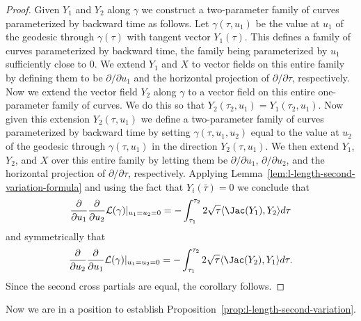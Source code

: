 \begin{proof}
\sketch
{}
Given $Y_1$ and $Y_2$ along $\gamma$ we construct a two-parameter
family of curves parameterized by backward time as follows. Let
$\gamma(\tau,u_1)$ be the value at $u_1$ of the geodesic through
$\gamma(\tau)$ with tangent vector $Y_1(\tau)$. This defines a
family of curves parameterized by backward time, the family being
parameterized by  $u_1$ sufficiently close to $0$. We extend
 $Y_1$ and $X$ to vector fields on this entire family by defining them to be
 $\partial/\partial u_1$ and the
horizontal projection of $\partial/\partial \tau$, respectively.
 Now we
extend the vector field $Y_2$ along $\gamma$ to a vector field on
this entire one-parameter family of curves. We do this so that
$Y_2(\tau_2,u_1)=Y_1(\tau_2,u_1)$. Now given this extension
$Y_2(\tau,u_1)$ we define a two-parameter family of curves
parameterized by backward time
 by setting $\gamma(\tau,u_1,u_2)$ equal to the value at $u_2$ of the geodesic
 through $\gamma(\tau,u_1)$ in the direction $Y_2(\tau,u_1)$.
 We then extend  $Y_1$, $Y_2$, and $X$ over this entire family by letting them be
 $\partial/\partial u_1$,
$\partial/\partial u_2$, and the horizontal projection of $\partial/ \partial
\tau$, respectively. Applying Lemma~\ref{lem:l-length-second-variation-formula} and using the fact that
$Y_i(\bar\tau)=0$ we conclude that
$$\frac{\partial}{\partial u_1}\frac{\partial}{\partial u_2}{\mathcal L}(\gamma)|_{u_1=u_2=0}= -\int_{\tau_1}^{\tau_2}2\sqrt{\tau}\langle
\Jac(Y_1),Y_2\rangle d\tau$$ and symmetrically that
$$\frac{\partial}{\partial u_2}\frac{\partial}{\partial u_1}{\mathcal L}(\gamma)|_{u_1=u_2=0}= -\int_{\tau_1}^{\tau_2}2\sqrt{\tau}\langle
\Jac(Y_2),Y_1\rangle d\tau.$$ Since the second cross partials
are equal, the corollary follows.
\end{proof}





Now we are in a position to establish Proposition~\ref{prop:l-length-second-variation}.


